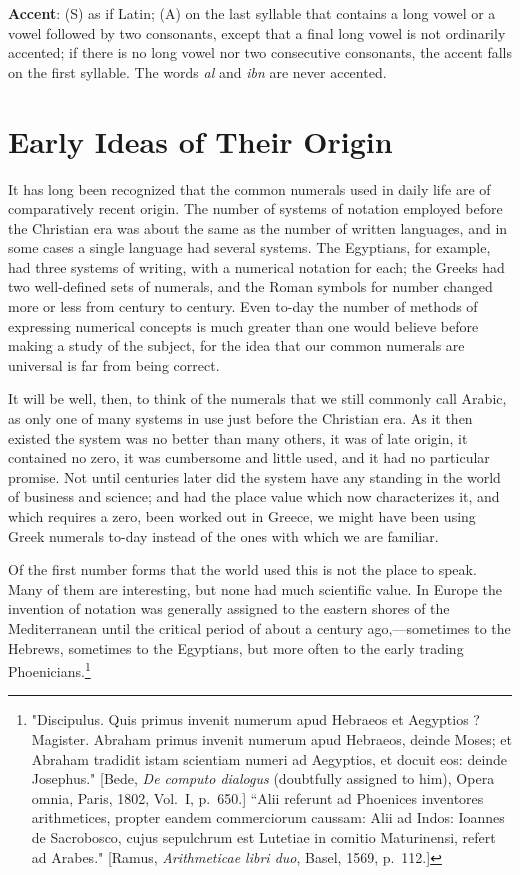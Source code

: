 \documentclass[11pt,a4paper]{article}
\begin{document}
\smallskip
\noindent\textbf{Accent}: (S) as if Latin; (A) on the last syllable that contains a long vowel or a vowel followed by two consonants, except that a final long vowel is not ordinarily accented; if there is no long vowel nor two consecutive consonants, the accent falls on the first syllable. The words \textit{al} and \textit{ibn} are never accented.

\newpage


\section{Early Ideas of Their Origin}

It has long been recognized that the common numerals used in daily life are of comparatively recent origin. The number of systems of notation employed before the Christian era was about the same as the number of written languages, and in some cases a single language had several systems. The Egyptians, for example, had three systems of writing, with a numerical notation for each; the Greeks had two well-defined sets of numerals, and the Roman symbols for number changed more or less from century to century. Even to-day the number of methods of expressing numerical concepts is much greater than one would believe before making a study of the subject, for the idea that our common numerals are universal is far from being correct.

It will be well, then, to think of the numerals that we still commonly call Arabic, as only one of many systems in use just before the Christian era. As it then existed the system was no better than many others, it was of late origin, it contained no zero, it was cumbersome and little used, and it had no particular promise. Not until centuries later did the system have any standing in the world of business and science; and had the place value which now characterizes it, and which requires a zero, been worked out in Greece, we might have been using Greek numerals to-day instead of the ones with which we are familiar.

Of the first number forms that the world used this is not the place to speak. Many of them are interesting, but none had much scientific value. In Europe the invention of notation was generally assigned to the eastern shores of the Mediterranean until the critical period of about a century ago,---sometimes to the Hebrews, sometimes to the Egyptians, but more often to the early trading Phoenicians.\footnote{"Discipulus. Quis primus invenit numerum apud Hebraeos et Aegyptios ? Magister. Abraham primus invenit numerum apud Hebraeos, deinde Moses; et Abraham tradidit istam scientiam numeri ad Aegyptios, et docuit eos: deinde Josephus." [Bede, \textit{De computo dialogus} (doubtfully assigned to him), Opera omnia, Paris, 1802, Vol.~I, p.~650.] ``Alii referunt ad Phoenices inventores arithmetices, propter eandem commerciorum caussam: Alii ad Indos: Ioannes de Sacrobosco, cujus sepulchrum est Lutetiae in comitio Maturinensi, refert ad Arabes." [Ramus, \textit{Arithmeticae libri duo}, Basel, 1569, p.~112.]}
\end{document}
